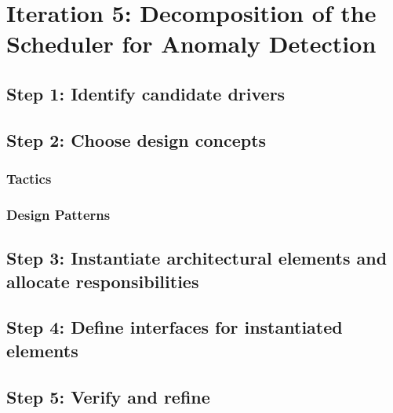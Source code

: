 \section{Iteration 5: Decomposition of the Scheduler for Anomaly Detection}
\label{add:it5}

\subsection{Step 1: Identify candidate drivers}
\label{add:it5/drivers}

\subsection{Step 2: Choose design concepts}
\label{add:it5/concepts}

\subsubsection{Tactics}
\label{add:it5/tactics}

\subsubsection{Design Patterns}
\label{add:it5/patterns}

\subsection{Step 3: Instantiate architectural elements and allocate responsibilities}
\label{add:it5/elements}

\subsection{Step 4: Define interfaces for instantiated elements}
\label{add:it5/interfaces}

\subsection{Step 5: Verify and refine}
\label{add:it5/verification}